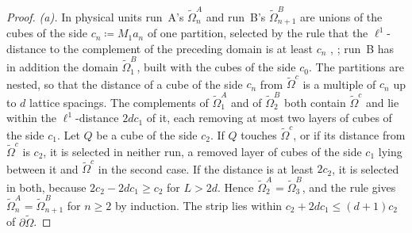 \begin{proof}
\emph{(a).} In physical units run~A's $\tilde\Omega^A_n$ and run~B's $\tilde\Omega^B_{n+1}$ are unions of the cubes of the side $c_n \coloneqq M_1a_n$ of one partition, selected by the rule that the $\ell^1$-distance to the complement of the preceding domain is at least $c_n$ \cite[p.~256, ll.~57--62]{BalabanCRE}, \cite[p.~223, l.~16]{BalabanPRT2}; run~B has in addition the domain $\tilde\Omega^B_1$, built with the cubes of the side $c_0$. The partitions are nested, so that the distance of a cube of the side $c_n$ from $\tilde\Omega^c$ is a multiple of $c_n$ up to $d$ lattice spacings. The complements of $\tilde\Omega^A_1$ and of $\tilde\Omega^B_2$ both contain $\tilde\Omega^c$ and lie within the $\ell^1$-distance $2dc_1$ of it, each removing at most two layers of cubes of the side $c_1$. Let $Q$ be a cube of the side $c_2$. If $Q$ touches $\tilde\Omega^c$, or if its distance from $\tilde\Omega^c$ is $c_2$, it is selected in neither run, a removed layer of cubes of the side $c_1$ lying between it and $\tilde\Omega^c$ in the second case. If the distance is at least $2c_2$, it is selected in both, because $2c_2 - 2dc_1 \geq c_2$ for $L > 2d$. Hence $\tilde\Omega^A_2 = \tilde\Omega^B_3$, and the rule gives $\tilde\Omega^A_n = \tilde\Omega^B_{n+1}$ for $n \geq 2$ by induction. The strip lies within $c_2 + 2dc_1 \leq (d + 1)c_2$ of $\partial\tilde\Omega$.


\end{proof}

